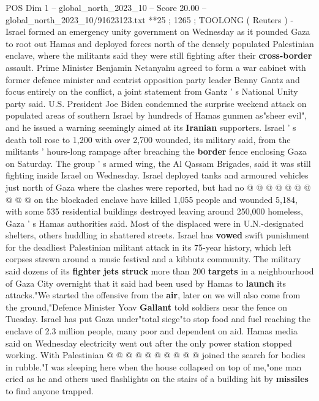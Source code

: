 \begin{textsample}{POS Dim 1 – global\_north\_2023\_10 – Score 20.00 – global\_north\_2023\_10/91623123.txt}  \label{ex:f1_pos_144}
**25 ; 1265 ; TOOLONG ( Reuters ) - Israel formed an emergency unity government on Wednesday as it pounded Gaza to root out Hamas and deployed forces north of the densely populated Palestinian enclave, where the militants said they were still fighting after their \textbf{cross-border} assault.
Prime Minister Benjamin Netanyahu agreed to form a war cabinet with former defence minister and centrist opposition party leader Benny Gantz and focus entirely on the conflict, a joint statement from Gantz ' s National Unity party said.
U.S.
President Joe Biden condemned the surprise weekend attack on populated areas of southern Israel by hundreds of Hamas gunmen as"sheer evil", and he issued a warning seemingly aimed at its \textbf{Iranian} supporters.
Israel ' s death toll rose to 1,200 with over 2,700 wounded, its military said, from the militants ' hours-long rampage after breaching the \textbf{border} fence enclosing Gaza on Saturday.
The group ' s armed wing, the Al Qassam Brigades, said it was still fighting inside Israel on Wednesday.
Israel deployed tanks and armoured vehicles just north of Gaza where the clashes were reported, but had no @ @ @ @ @ @ @ @ @ @ on the blockaded enclave have killed 1,055 people and wounded 5,184, with some 535 residential buildings destroyed leaving around 250,000 homeless, Gaza ' s Hamas authorities said.
Most of the displaced were in U.N.-designated shelters, others huddling in shattered streets.
Israel has \textbf{vowed} swift punishment for the deadliest Palestinian militant attack in its 75-year history, which left corpses strewn around a music festival and a kibbutz community.
The military said dozens of its \textbf{fighter} \textbf{jets} \textbf{struck} more than 200 \textbf{targets} in a neighbourhood of Gaza City overnight that it said had been used by Hamas to \textbf{launch} its attacks."We started the offensive from the \textbf{air}, later on we will also come from the ground,"Defence Minister Yoav \textbf{Gallant} told soldiers near the fence on Tuesday.
Israel has put Gaza under"total siege"to stop food and fuel reaching the enclave of 2.3 million people, many poor and dependent on aid.
Hamas media said on Wednesday electricity went out after the only power station stopped working.
With Palestinian @ @ @ @ @ @ @ @ @ @ joined the search for bodies in rubble."I was sleeping here when the house collapsed on top of me,"one man cried as he and others used flashlights on the stairs of a building hit by \textbf{missiles} to find anyone trapped.

\end{textsample}
